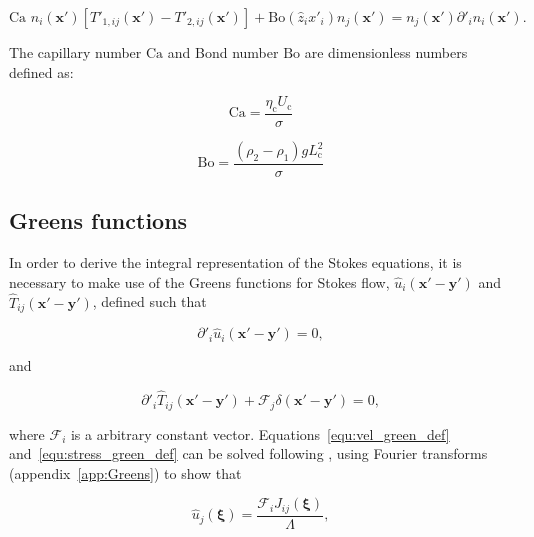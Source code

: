 \documentclass[12pt]{article}
\begin{document}
\begin{equation}
\label{equ:nodim_fluid_fluid_dyn}
\text{Ca } n_{i}(\boldsymbol{x'}) [T'_{1,ij}(\boldsymbol{x'}) - T'_{2,ij}(\boldsymbol{x'})] + \text{Bo}(\hat{z}_{i} x'_{i}) n_{j}(\boldsymbol{x'}) = n_{j}(\boldsymbol{x'}) \partial'_{i} n_{i}(\boldsymbol{x'}) .
\end{equation}

The capillary number $\text{Ca}$ and  Bond number $\text{Bo}$ are dimensionless numbers defined as:

\begin{equation}
\label{equ:cap}
\text{Ca} = \frac{\eta_{\text{c}} U_{\text{c}}}{\sigma}
\end{equation}

\begin{equation}
\label{equ:Bond}
\text{Bo} = \frac{(\rho_{2} - \rho_{1}) g L_{\text{c}}^{2}}{\sigma}
\end{equation}

\subsection{Greens functions}
\label{subsec:BIE_deriv}

In order to derive the integral representation of the Stokes equations, it is necessary to make use of the Greens functions \citep{Riley06} for Stokes flow, $\hat{u}_{i}(\boldsymbol{x'} - \boldsymbol{y'})$ and $\hat{T}_{ij}(\boldsymbol{x'} - \boldsymbol{y'})$, defined such that \citep{Kim05}

\begin{equation}
\label{equ:vel_green_def}
\partial'_{i} \hat{u}_{i}(\boldsymbol{x'} - \boldsymbol{y'}) = 0,
\end{equation}

and

\begin{equation}
\label{equ:stress_green_def}
\partial'_{i} \hat{T}_{ij}(\boldsymbol{x'} - \boldsymbol{y'}) + \mathcal{F}_{j} \delta(\boldsymbol{x'} - \boldsymbol{y'}) = 0 , 
\end{equation}

where $\mathcal{F}_{i}$ is a arbitrary constant vector. Equations~\ref{equ:vel_green_def} and~\ref{equ:stress_green_def} can be solved following \citet{Ladyzhenskaya63}, using Fourier transforms (appendix~\ref{app:Greens}) to show that

\begin{equation}
\label{equ:vel_green}
\hat{u}_{j}(\boldsymbol{\xi}) = \frac{ \mathcal{F}_{i} J_{ij}(\boldsymbol{\xi})}{\Lambda} ,
\end{equation}
\end{document}
